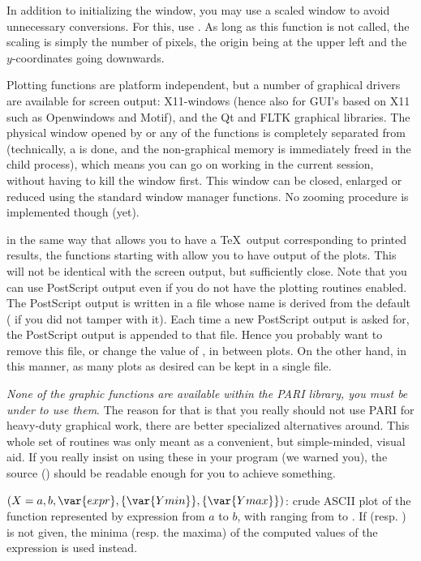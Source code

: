    In addition to initializing the window, you may use a scaled window to
avoid unnecessary conversions. For this, use . As long as this
function is not called, the scaling is simply the number of pixels, the
origin being at the upper left and the $y$-coordinates going downwards.

   Plotting functions are platform independent, but a number of graphical
drivers are available for screen output: X11-windows (hence also for GUI's
based on X11 such as Openwindows and Motif), and the Qt and FLTK graphical
libraries. The physical window opened by  or any of the
 functions is completely separated from  (technically, a
 is done, and the non-graphical memory is immediately freed in the
child process), which means you can go on working in the current 
session, without having to kill the window first. This window can be closed,
enlarged or reduced using the standard window manager functions. No zooming
procedure is implemented though (yet).

 in the same way that  allows you to have a \TeX\ output
corresponding to printed results, the functions starting with  allow
you to have  output of the plots. This will not be identical
with the screen output, but sufficiently close. Note that you can use
PostScript output even if you do not have the plotting routines enabled. The
PostScript output is written in a file whose name is derived from the
 default ( if you did not tamper with it). Each
time a new PostScript output is asked for, the PostScript output is appended
to that file. Hence you probably want to remove this file, or change the
value of , in between plots. On the other hand, in this manner,
as many plots as desired can be kept in a single file. \smallskip

 \emph{None of the graphic functions are available
within the PARI library, you must be under  to use them}. The reason
for that is that you really should not use PARI for heavy-duty graphical work,
there are better specialized alternatives around. This whole set of routines
was only meant as a convenient, but simple-minded, visual aid. If you really
insist on using these in your program (we warned you), the source
() should be readable enough for you to achieve something.


$(X=a,b,\var{expr},\{\var{Ymin}\},\{\var{Ymax}\})$: \label{se:plot}crude ASCII plot of the function represented by expression 
from $a$ to $b$, with  ranging from  to . If
 (resp. ) is not given, the minima (resp. the maxima) of
the computed values of the expression is used instead.

